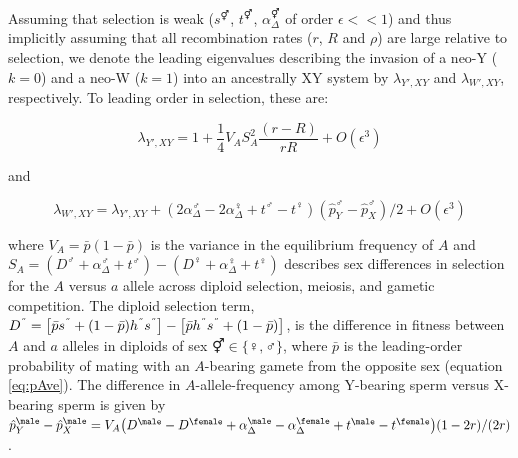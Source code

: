 \documentclass[10pt,letterpaper]{article}
\begin{document}
Assuming that selection is weak ($s^\Hermaphrodite$, $t^\Hermaphrodite$, $\alpha_{\Delta}^\Hermaphrodite$ of order $\epsilon<<1$) and thus implicitly assuming that all recombination rates ($r$, $R$ and $\rho$) are large relative to selection, we denote the leading eigenvalues describing the invasion of a neo-Y ($k=0$) and a neo-W ($k=1$) into an ancestrally XY system by $\lambda_{Y',XY}$ and $\lambda_{W',XY}$, respectively. To leading order in selection, these are:

\begin{equation}
\lambda_{Y',XY} =1+ \frac{1}{4}V_{A}S_{A}^2\frac{ \left( r-R \right) }{r R}+O\left(\epsilon^3 \right) 
\label{eq:lambda_neoY}
\end{equation}

\noindent 
and 

\begin{equation}
\lambda_{W',XY} =\lambda_{Y',XY}+\left(2\alpha_{\Delta}^\male-2\alpha_{\Delta}^\female+t^\male-t^\female \right) \left( \hat{p}^\male_Y-\hat{p}^\male_X \right)/2
+O\left(\epsilon^3 \right)
\label{eq:lambda_neoW}
\end{equation}

\noindent
where $V_{A}=\bar{p}(1-\bar{p})$ is the variance in the equilibrium frequency of $A$ and $S_{A}=(D^\male +\alpha_{\Delta}^\male+t^\male) - (D^\female+\alpha_{\Delta}^\female+t^\female)$ describes sex differences in selection for the $A$ versus $a$ allele across diploid selection, meiosis, and gametic competition.
The diploid selection term, $D^\Hermaphrodite=\big{[} \bar{p}s^\Hermaphrodite+(1-\bar{p})h^\Hermaphrodite s^\Hermaphrodite\big{]} -\big{[} \bar{p}h^\Hermaphrodite s^\Hermaphrodite+(1-\bar{p}) \big{]}$, is the difference in fitness between $A$ and $a$ alleles in diploids of sex $\Hermaphrodite \in \{\female,\male\}$, where $\bar{p}$ is the leading-order probability of mating with an $A$-bearing gamete from the opposite sex (equation \ref{eq:pAve}). 
The difference in $A$-allele-frequency among Y-bearing sperm versus X-bearing sperm is given by $\hat{p}^\male_Y-\hat{p}^\male_X=V_{A}\big{(}D^\male - D^\female+\alpha_{\Delta}^\male-\alpha_{\Delta}^\female+t^\male-t^\female\big{)}(1-2r)/(2r)$. 
\end{document}
